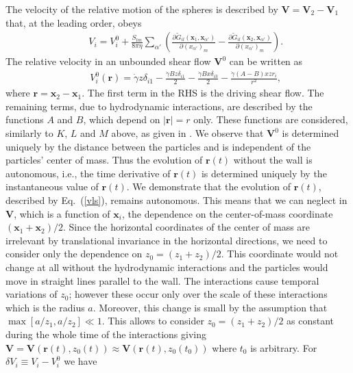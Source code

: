 The velocity of the relative motion of the spheres is described by $\bm V=\bm V_2-\bm V_1$ that, at the leading order, obeys
\begin{eqnarray}&&\!\!\!\!\!\!\!\!\!\!\!\!\!\!\!
V_i\!=\!V^0_i\!+\!\frac{S_{lm}}{8\pi \eta}\sum_{\alpha'}\left(\frac{\partial {\tilde G}_{il}(\bm x_1, \bm x_{\alpha'})}{\partial (x_{\alpha'})_m}\!-\!\frac{\partial {\tilde G}_{il}(\bm x_2, \bm x_{\alpha'})}{\partial (x_{\alpha'})_m}\right). \label{vls}
\end{eqnarray}
The relative velocity in an unbounded shear flow $\bm V^0$ can be written as \citep{batchelor_green_1972}
\begin{eqnarray}&&\!\!\!\!\!\!\!\!\!\!\!\!\!\!\!\!
V^0_i(\bm r)\!=\!\dot \gamma z\delta_{i1}\!-\!\frac{\dot \gamma B  z\delta_{i1}}{2}\!-\!\frac{\dot \gamma B x\delta_{i3}}{2}\!-\!\frac{\dot \gamma(A-B)xz r_i}{r^2}, \label{unpert}
\end{eqnarray}
where $\bm r=\bm x_2-\bm x_1$. The first term in the RHS is the driving shear flow. The remaining terms, due to hydrodynamic interactions, are described by the functions $A$ and $B$, which depend on $|\bm r|=r$ only. These functions are considered, similarly to $K$, $L$ and $M$ above, as given in \cite{batchelor_green_1972}.
We observe that $\bm V^0$ is determined uniquely by the distance between the particles and is independent of the particles' center of mass. Thus the evolution of $\bm r(t)$ without the wall is autonomous, i.e., the time derivative of $\bm r(t)$ is determined uniquely by the instantaneous value of $\bm r(t)$. We demonstrate that the
evolution of $\bm r(t)$, described by Eq.~(\ref{vls}), remains autonomous. This means that we can neglect in $\bm V$, which is a function of $\bm x_i$, the dependence on the center-of-mass coordinate $(\bm x_1+\bm x_2)/2$. Since the horizontal coordinates of the center of mass are irrelevant by translational invariance in the horizontal directions, we need to consider only the dependence on $z_0=(z_1+z_2)/2$. This coordinate would not change at all without the hydrodynamic interactions and the particles would move in straight lines parallel to the wall. The interactions cause temporal variations of $z_0$; however these occur only over the scale of these interactions which is the radius $a$. Moreover, this change is small by the assumption that $\max [a/z_1, a/z_2]\ll 1$. This allows to consider $z_0=(z_1+z_2)/2$ as constant during the whole time of the interactions giving $\bm V=\bm V(\bm r(t), z_0(t))\approx \bm V(\bm r(t), z_0(t_0))$ where $t_0$ is arbitrary. For $\delta V_i\equiv V_i\!-\!V^0_i$ we have
